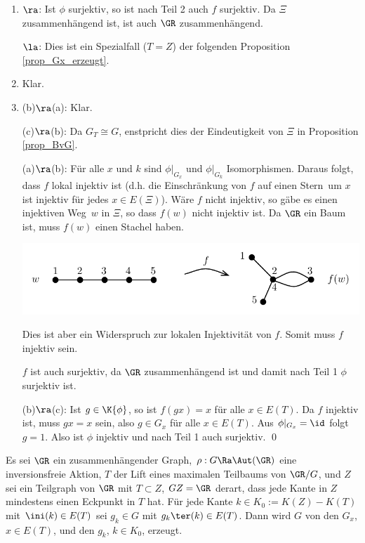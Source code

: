 \bew \begin{enumerate}
\item \glqq$\ra$\grqq: Ist $\phi$ surjektiv, so ist nach Teil 2 auch
$f$ surjektiv. Da $\Xi$ zusammenhängend ist, ist auch $\GR$
zusammenhängend.

\glqq$\la$\grqq: Dies ist ein Spezialfall ($T=Z$) der folgenden
Proposition \ref{prop_Gx_erzeugt}.
\item Klar.
\item
\glqq (b)$\ra$(a)\grqq: Klar.

\glqq (c)$\ra$(b)\grqq: Da $G_T\cong G$, enstpricht dies der 
Eindeutigkeit von $\Xi$ in Proposition \ref{prop_BvG}.

\glqq (a)$\ra$(b)\grqq: Für alle $x$ und $k$ sind
$\phi|_{G_x}$ und $\phi|_{G_k}$ Isomorphismen.
Daraus folgt, dass $f$ lokal injektiv ist (d.h. die Einschränkung
von $f$ auf einen \glqq Stern\grqq\ um $x$ ist injektiv für jedes
$x\in E(\Xi)$).
Wäre $f$ nicht injektiv, so gäbe es einen \glqq injektiven Weg\grqq\
$w$ in $\Xi$, so dass $f(w)$ nicht injektiv ist.
Da $\GR$ ein Baum ist, muss $f(w)$ einen Stachel haben.
\begin{center}
	\includegraphics{grugraImages/winjektiv}
\end{center}
Dies ist aber ein Widerspruch zur lokalen Injektivität von $f$.
Somit muss $f$ injektiv sein.

$f$ ist auch surjektiv, da $\GR$ zusammenhängend ist und damit nach
Teil 1 $\phi$ surjektiv ist.

\glqq (b)$\ra$(c)\grqq: Ist $g\in\K{\phi}$, so ist $f(gx)=x$
für alle $x\in E(T)$. Da $f$ injektiv ist, muss $gx=x$ sein,
also $g\in G_x$ für alle $x\in E(T)$. Aus $\phi|_{G_x}=\id$
folgt $g=1$. Also ist $\phi$ injektiv und nach Teil 1 auch
surjektiv.
\qed
\end{enumerate}

\PROP \label{prop_Gx_erzeugt}
Es sei $\GR$ ein zusammenhängender Graph, $\rho:G\Ra\Aut(\GR)$
eine inversionsfreie Aktion, $T$ der Lift eines maximalen
Teilbaums von $\GR/G$, und $Z$ sei ein Teilgraph von $\GR$ mit
$T\subset Z$, $GZ=\GR$ derart, dass jede Kante in $Z$ mindestens
einen Eckpunkt in $T$ hat.
Für jede Kante $k\in K_0 := K(Z)-K(T)$ mit $\ini(k)\in E(T)$
sei $g_k\in G$ mit $g_k \ter(k)\in E(T)$.
Dann wird $G$ von den $G_x$, $x\in E(T)$, und den $g_k$, $k\in K_0$,
erzeugt.

